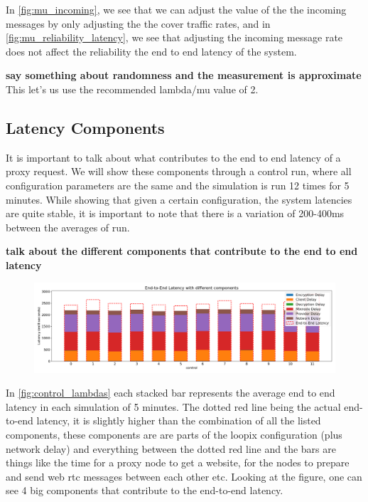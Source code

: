 \documentclass[a4paper,11pt,oneside]{report}
\begin{document}
In \autoref{fig:mu_incoming}, we see that we can adjust the value of the the incoming messages by only adjusting the the cover traffic rates, and in \autoref{fig:mu_reliability_latency}, we see that adjusting the incoming message rate does not affect the reliability the end to end latency of the system.

\textbf{say something about randomness and the measurement is approximate}
This let's us use the recommended lambda/mu value of 2.

\subsection{Latency Components}
It is important to talk about what contributes to the end to end latency of a proxy request. We will show these components through a control run, where all configuration parameters are the same and the simulation is run 12 times for 5 minutes. While showing that given a certain configuration, the system latencies are quite stable, it is important to note that there is a variation of 200-400ms between the averages of run. 

\textbf{talk about the different components that contribute to the end to end latency}

\begin{figure}[htbp]
    \centering
    \includegraphics[width=\textwidth]{plots/control_latency_components.png}
    \caption{}
    \label{fig:control_lambdas}
\end{figure}

In \autoref{fig:control_lambdas} each stacked bar represents the average end to end latency in each simulation of 5 minutes. The dotted red line being the actual end-to-end latency, it is slightly higher than the combination of all the listed components, these components are are parts of the loopix configuration (plus network delay) and everything between the dotted red line and the bars are things like the time for a proxy node to get a website, for the nodes to prepare and send web rtc messages between each other etc. Looking at the figure, one can see 4 big components that contribute to the end-to-end latency.
\end{document}
